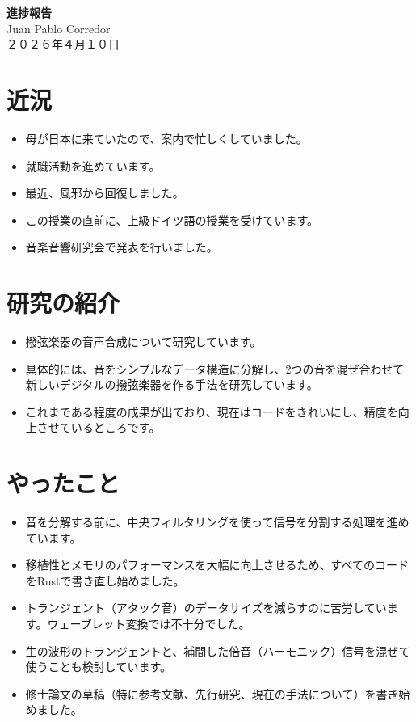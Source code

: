 \documentclass[a4paper, 12pt]{article}
\begin{document}
\begin{center}
    {\LARGE \bfseries 進捗報告} \\ %
    \vspace{0.3em} %
    Juan Pablo Corredor \\ %
    ２０２６年４月１０日 %
\end{center}
\vspace{0.5em} %

\section*{近況}
\begin{itemize}
    \item 母が日本に来ていたので、案内で忙しくしていました。
    \item 就職活動を進めています。
    \item 最近、風邪から回復しました。
    \item この授業の直前に、上級ドイツ語の授業を受けています。
    \item 音楽音響研究会で発表を行いました。
\end{itemize}

\section*{研究の紹介}
\begin{itemize}
    \item 撥弦楽器の音声合成について研究しています。
    \item 具体的には、音をシンプルなデータ構造に分解し、2つの音を混ぜ合わせて新しいデジタルの撥弦楽器を作る手法を研究しています。
    \item これまである程度の成果が出ており、現在はコードをきれいにし、精度を向上させているところです。
\end{itemize}

\section*{やったこと}
\begin{itemize}
    \item 音を分解する前に、中央フィルタリングを使って信号を分割する処理を進めています。\cite{fitzgerald2010harmonic}
    \item 移植性とメモリのパフォーマンスを大幅に向上させるため、すべてのコードをRustで書き直し始めました。
    \item トランジェント（アタック音）のデータサイズを減らすのに苦労しています。ウェーブレット変換では不十分でした。
    \item 生の波形のトランジェントと、補間した倍音（ハーモニック）信号を混ぜて使うことも検討しています。
    \item 修士論文の草稿（特に参考文献、先行研究、現在の手法について）を書き始めました。
\end{itemize}
\end{document}
